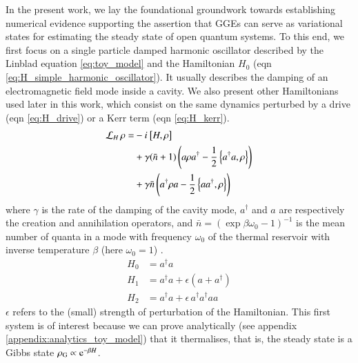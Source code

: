 In the present work, we lay the foundational groundwork towards establishing numerical evidence supporting the assertion that GGEs can serve as variational states for estimating the steady state of open quantum systems. 
To this end, we first focus on a single particle damped harmonic oscillator described by the Linblad equation \ref{eq:toy_model} and the Hamiltonian $H_0$ (eqn \ref{eq:H_simple_harmonic_oscillator}). 
It usually describes the damping of an electromagnetic field mode inside a cavity. We also present other Hamiltonians used later in this work, which consist on the same dynamics perturbed by a drive (eqn \ref{eq:H_drive}) or a Kerr term (eqn \ref{eq:H_kerr}).
\begin{equation}
\label{eq:toy_model}
\begin{split}
    \mathcal{L}_H \,\rho = &- i\mkern1mu \left[ H, \rho \right] \\ &+ \gamma (\bar n + 1) \left( a \rho  a^\dag - \frac{1}{2} \left\{  a^\dag   a,  \rho \right\} \right)\\ &+ \gamma \bar n  \left( a^\dag  \rho  a - \frac{1}{2} \left\{ a   a^\dag,  \rho \right\} \right)
    \end{split}
\end{equation}
where $\gamma$ is the rate of the damping of the cavity mode, $a^\dag$ and $a$ are respectively the creation and annihilation operators, and $\bar n = \left( \exp{\beta \omega_0} - 1 \right)^{-1}$ is the mean number of quanta in a mode with frequency $\omega_0$ of the thermal reservoir with inverse temperature $\beta$ (here $\omega_0=1$) .
\begin{align}
\label{eq:H_simple_harmonic_oscillator}
H_0 &=  a^\dag a \\
\label{eq:H_drive}
H_1 &=  a^\dag a + \epsilon \left( a + a^\dag \right)\\
\label{eq:H_kerr}
H_2 &=  a^\dag a + \epsilon \,  a^\dag a^\dag  a  a 
\end{align}
$\epsilon$ refers to the (small) strength of perturbation of the Hamiltonian. 
This first system is of interest because we can prove analytically (see appendix \ref{appendix:analytics_toy_model}) that it thermalises, that is, the steady state is a Gibbs state $\rho_{\rm G} \propto {\rm e}^{-\beta H}$.

